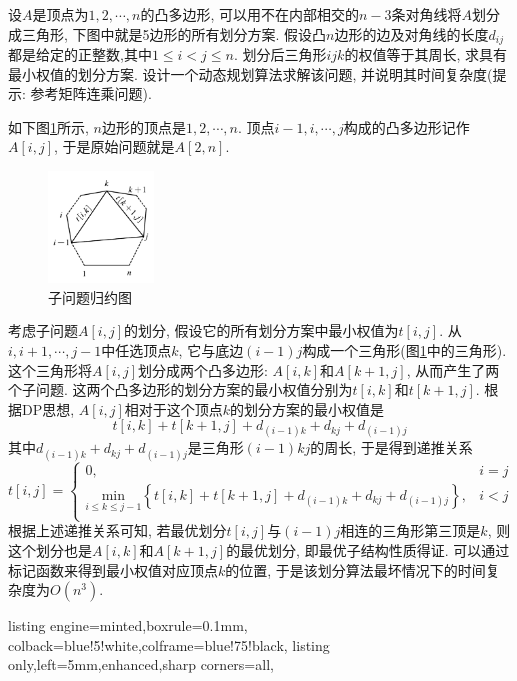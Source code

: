 \documentclass{article}
\begin{document}
\begin{homeworkProblem}
	设$A$是顶点为$1,2,\cdots,n$的凸多边形, 可以用不在内部相交的$n-3$条对角线将$A$划分成三角形, 下图中就是5边形的所有划分方案. 假设凸$n$边形的边及对角线的长度$d_{ij}$都是给定的正整数,其中$1\leq i<j\leq n$. 划分后三角形$ijk$的权值等于其周长, 求具有最小权值的划分方案. 设计一个动态规划算法求解该问题, 并说明其时间复杂度(提示: 参考矩阵连乘问题).
	
	如下图\ref{fig:子问题归约}所示, $n$边形的顶点是$1,2,\cdots,n$. 顶点$i-1,i,\cdots,j$构成的凸多边形记作$A[i,j]$, 于是原始问题就是$A[2,n]$.
	\begin{figure}[H]
		\centering
		\includegraphics[width=0.25\textwidth]{images/title/子问题归约.pdf}
		\caption{子问题归约图}
		\label{fig:子问题归约}
	\end{figure}
	考虑子问题$A[i,j]$的划分, 假设它的所有划分方案中最小权值为$t[i,j]$. 从$i,i+1,\cdots,j-1$中任选顶点$k$, 它与底边$(i-1)j$构成一个三角形(图\ref{fig:子问题归约}中的三角形). 这个三角形将$A[i,j]$划分成两个凸多边形: $A[i,k]$和$A[k+1,j]$, 从而产生了两个子问题. 这两个凸多边形的划分方案的最小权值分别为$t[i,k]$和$t[k+1,j]$. 根据DP思想, $A[i,j]$相对于这个顶点$k$的划分方案的最小权值是
	$$
	t\left[ i,k \right] +t\left[ k+1,j \right] +d_{\left( i-1 \right) k}+d_{kj}+d_{\left( i-1 \right) j}
	$$
	其中$d_{\left( i-1 \right) k}+d_{kj}+d_{\left( i-1 \right) j}$是三角形$(i-1)kj$的周长, 于是得到递推关系
	$$
	t\left[ i,j \right] =\begin{cases}
		0,&		i=j\\
		\underset{i\le k\le j-1}{\text{min}}\left\{ t\left[ i,k \right] +t\left[ k+1,j \right] +d_{\left( i-1 \right) k}+d_{kj}+d_{\left( i-1 \right) j} \right\} ,&		i<j\\
	\end{cases}
	$$
	根据上述递推关系可知, 若最优划分$t[i,j]$与$(i-1)j$相连的三角形第三顶是$k$, 则这个划分也是$A[i,k]$和$A[k+1,j]$的最优划分, 即最优子结构性质得证. 可以通过标记函数来得到最小权值对应顶点$k$的位置, 于是该划分算法最坏情况下的时间复杂度为$O\left( n^3 \right)$.
\begin{tcblisting}{listing engine=minted,boxrule=0.1mm,
colback=blue!5!white,colframe=blue!75!black,
listing only,left=5mm,enhanced,sharp corners=all,
}
\end{tcblisting}
\end{homeworkProblem}
\end{document}
